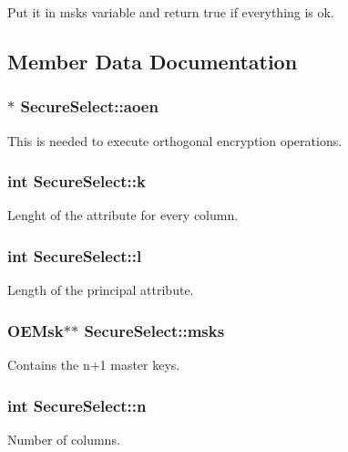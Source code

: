 Put it in msks variable and return true if everything is ok. 

\subsection{Member Data Documentation}
\subsubsection[{\texorpdfstring{aoen}{aoen}}]{$\ast$ Secure\+Select\+::aoen}\hypertarget{classSecureSelect_ace499f63f2609b19c429bee5638db42d}{}\label{classSecureSelect_ace499f63f2609b19c429bee5638db42d}
This is needed to execute orthogonal encryption operations. 
\subsubsection[{\texorpdfstring{k}{k}}]{\setlength{\rightskip}{0pt plus 5cm}int Secure\+Select\+::k}\hypertarget{classSecureSelect_aa9172d68f4a5f9aef784703878e2c352}{}\label{classSecureSelect_aa9172d68f4a5f9aef784703878e2c352}
Lenght of the attribute for every column. 
\subsubsection[{\texorpdfstring{l}{l}}]{\setlength{\rightskip}{0pt plus 5cm}int Secure\+Select\+::l}\hypertarget{classSecureSelect_a010ed62263ff19f8b07dfaa298962f24}{}\label{classSecureSelect_a010ed62263ff19f8b07dfaa298962f24}
Length of the principal attribute. 
\subsubsection[{\texorpdfstring{msks}{msks}}]{\setlength{\rightskip}{0pt plus 5cm}O\+E\+Msk$\ast$$\ast$ Secure\+Select\+::msks}\hypertarget{classSecureSelect_a8f1233a931a2dce84a7f9588721d8301}{}\label{classSecureSelect_a8f1233a931a2dce84a7f9588721d8301}
Contains the n+1 master keys. 
\subsubsection[{\texorpdfstring{n}{n}}]{\setlength{\rightskip}{0pt plus 5cm}int Secure\+Select\+::n}\hypertarget{classSecureSelect_a0834ef0de36dad948cec8d54fc89aada}{}\label{classSecureSelect_a0834ef0de36dad948cec8d54fc89aada}
Number of columns. 
